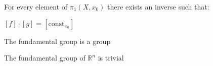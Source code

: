     \begin{lemma}
        \label{lem:loop_comp_inv}

        For every element of $\pi_1(X, x_0)$ there exists an inverse such that: 

        $[f] \cdot [g] = [\text{const}_{x_0}]$
    \end{lemma}
    
    \begin{theorem} 
        \label{thm:fundamental_group_is_group}

        The fundamental group is a group
    \end{theorem}

    \begin{theorem} 
        \label{thm:Rn_fundamental_group}
        
        The fundamental group of $\mathbb{R}^n$ is trivial
    \end{theorem}